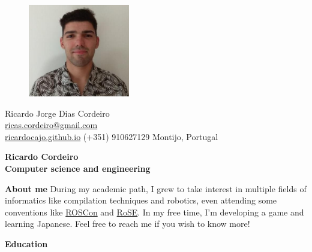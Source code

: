 \documentclass[a4paper,12pt,final]{memoir}
\newcommand{\Sep}{\vspace{1.5em}}
\newcommand{\SmallSep}{\vspace{0.5em}}
\newenvironment{AboutMe}
	{\ignorespaces\textbf{\color{RoyalBlue} About me}}
	{\Sep\ignorespacesafterend}
\newcommand{\CVSection}[1]
	{\Large\textbf{#1}\par
	\SmallSep\normalsize\normalfont}
\begin{document}
%
\begin{figure}
	\hfill
	\includegraphics[width=0.6\columnwidth]{cv-photo.png}
	\vspace{-7cm}
\end{figure}

\begin{flushright}\small
	Ricardo Jorge Dias Cordeiro \\
	\url{ricas.cordeiro@gmail.com}  \\
	\href{https://ricardocajo.github.io/}{ricardocajo.github.io}
    (+351) 910627129
	Montijo, Portugal
\end{flushright}\normalsize
\framebreak


\Huge\bfseries {\color{RoyalBlue} Ricardo Cordeiro} \\
\Large\bfseries  Computer science and engineering \\

\normalsize\normalfont

\begin{AboutMe}
During my academic path, I grew to take interest in multiple fields of informatics like compilation techniques and robotics, even attending some conventions like \href{https://roscon.ros.org/world/2021/}{ROSCon} and \href{https://rose-workshops.github.io/rose2022/}{RoSE}. In my free time, I'm developing a game and learning Japanese. Feel free to reach me if you wish to know more!
\end{AboutMe}


\CVSection{Education}
\end{document}
